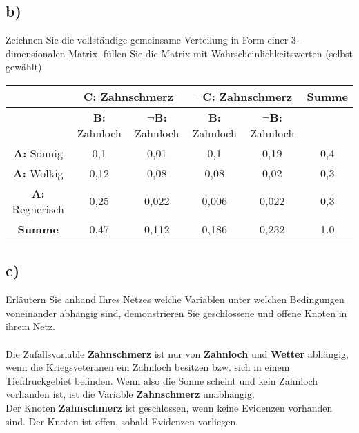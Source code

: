 \documentclass[12pt, a4paper]{article}
\begin{document}
\subsection*{b)}
Zeichnen Sie die vollständige gemeinsame Verteilung in Form einer 3-dimensionalen Matrix, füllen Sie die Matrix mit Wahrscheinlichkeitswerten (selbst gewählt).
\\
\hspace{-0.5cm}
\begin{flushleft}
\begin{tabular}[bct]{|c|c|c|c|c|c|}
\hline \bigstrut
& \multicolumn{2}{|c|}{\textbf{C:} Zahnschmerz } & \multicolumn{2}{|c|}{\textbf{$\neg$C}: Zahnschmerz } & \textbf{Summe} \\
\hline \bigstrut
& \textbf{B:} Zahnloch & \textbf{$\neg$B:} Zahnloch & \textbf{B:} Zahnloch & \textbf{$\neg$B:} Zahnloch & \\
\hline \bigstrut
\textbf{A:} Sonnig & 0,1 & 0,01 & 0,1 & 0,19 & 0,4 \\
\hline \bigstrut
\textbf{A:} Wolkig & 0,12 & 0,08 & 0,08 & 0,02 & 0,3 \\
\hline \bigstrut
\textbf{A:} Regnerisch & 0,25 & 0,022 & 0,006 & 0,022 & 0,3 \\
\hline \bigstrut
\textbf{Summe} & 0,47 & 0,112 & 0,186 & 0,232 & 1.0 \\
\hline
\end{tabular}
\end{flushleft}


\subsection*{c)}
Erläutern Sie anhand Ihres Netzes welche Variablen unter welchen Bedingungen voneinander abhängig sind, demonstrieren Sie geschlossene und offene Knoten in ihrem Netz.
\\\\
Die Zufallsvariable \textbf{Zahnschmerz} ist nur von \textbf{Zahnloch} und \textbf{Wetter} abhängig, wenn die Kriegsveteranen ein Zahnloch besitzen bzw. sich in einem Tiefdruckgebiet befinden. Wenn also die Sonne scheint und kein Zahnloch vorhanden ist, ist die Variable \textbf{Zahnschmerz} unabhängig.\\
Der Knoten \textbf{Zahnschmerz} ist geschlossen, wenn keine Evidenzen vorhanden sind. Der Knoten ist offen, sobald Evidenzen vorliegen.
\end{document}
